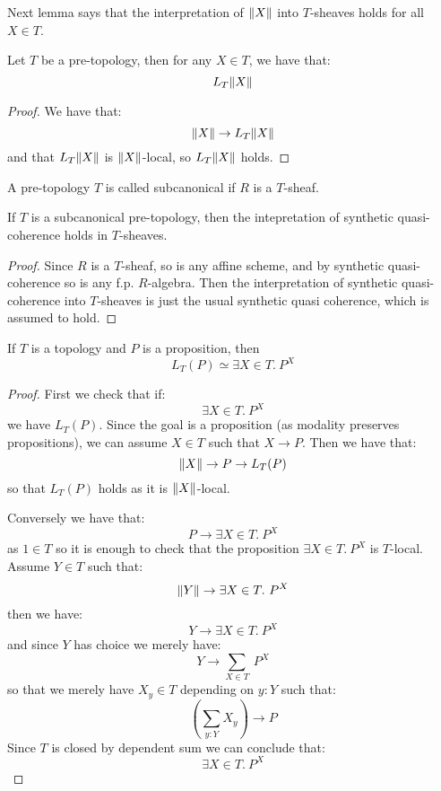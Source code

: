 Next lemma says that the interpretation of $\lVert X \rVert$ into $T$-sheaves holds for all $X\in T$.

\begin{lemma}\label{sheaves-inhabited}
Let $T$ be a pre-topology, then for any $X\in T$, we have that:
\[L_T\lVert X \rVert\]
\end{lemma}

\begin{proof}
We have that: 
\[\lVert X \rVert\to L_T\lVert X \rVert\]
and that $L_T\lVert X \rVert$ is $\lVert X \rVert$-local, so $L_T\lVert X \rVert$ holds.
\end{proof}

\begin{definition}
A pre-topology $T$ is called subcanonical if $R$ is a $T$-sheaf.
\end{definition}

\begin{lemma}\label{sheaves-quasi-coherent}
If $T$ is a subcanonical pre-topology, then the intepretation of synthetic quasi-coherence holds in $T$-sheaves.
\end{lemma}

\begin{proof}
Since $R$ is a $T$-sheaf, so is any affine scheme, and by synthetic quasi-coherence so is any f.p. $R$-algebra. Then the interpretation of synthetic quasi-coherence into $T$-sheaves is just the usual synthetic quasi coherence, which is assumed to hold.
\end{proof}

\begin{lemma}\label{sheaf-replacement-proposition}
If $T$ is a topology and $P$ is a proposition, then 
\[L_T(P) \simeq \exists X\in T.\ P^X\]
\end{lemma}

\begin{proof}
First we check that if: 
\[\exists X\in T.\ P^X\]
we have $L_T(P)$. Since the goal is a proposition (as modality preserves propositions), we can assume $X\in T$ such that $X\to P$. Then we have that: 
\[\lVert X \rVert\to P\to L_T(P)\] 
so that $L_T(P)$ holds as it is $\lVert X \rVert$-local.

Conversely we have that:
\[P \to \exists X\in T.\ P^X\] 
as $1\in T$ so it is enough to check that the proposition $\exists X\in T.\ P^X$ is $T$-local. Assume $Y\in T$ such that:
\[\lVert Y \rVert \to \exists X\in T.\ P^X\] 
then we have:
\[Y \to \exists X\in T.\ P^X\] 
and since $Y$ has choice we merely have:
\[Y \to \sum_{X\in T}\ P^X\] 
so that we merely have $X_y\in T$ depending on $y:Y$ such that:
\[(\sum_{y:Y}X_y) \to P\]
Since $T$ is closed by dependent sum we can conclude that:
\[\exists X\in T.\ P^X\] 
\end{proof}

